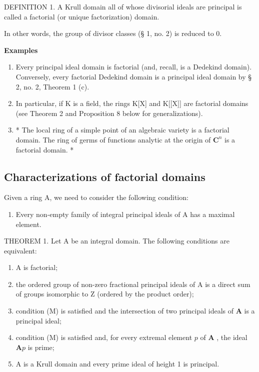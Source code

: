 DEFINITION 1. A Krull domain all of whose divisorial ideals are principal is called a factorial (or unique factorization) domain.

In other words, the group of divisor classes (§ 1, no. 2) is reduced to 0.

\textbf{Examples}\par

\begin{enumerate}
\def\labelenumi{(\arabic{enumi})}
\item
  Every principal ideal domain is factorial (and, recall, is a Dedekind domain). Conversely, every factorial Dedekind domain is a principal ideal domain by § 2, no. 2, Theorem 1 (c).
\item
  In particular, if K is a field, the rings K{[}X{]} and K{[}{[}X{]}{]} are factorial domains (see Theorem 2 and Proposition 8 below for generalizations).
\item
  * The local ring of a simple point of an algebraic variety is a factorial domain. The ring of germs of functions analytic at the origin of \(\mathbf{C}^n\) is a factorial domain. *
\end{enumerate}

\subsection{Characterizations of factorial domains}

Given a ring A, we need to consider the following condition:

\begin{enumerate}
\def\labelenumi{(\Alph{enumi})}
\setcounter{enumi}{12}
\tightlist
\item
  Every non-empty family of integral principal ideals of A has a maximal element.
\end{enumerate}

THEOREM 1. Let A be an integral domain. The following conditions are equivalent:

\begin{enumerate}
\def\labelenumi{(\alph{enumi})}
\item
  A is factorial;
\item
  the ordered group of non-zero fractional principal ideals of A is a direct sum of groups isomorphic to Z (ordered by the product order);
\item
  condition (M) is satisfied and the intersection of two principal ideals of \(\mathbf{A}\) is a principal ideal;
\item
  condition (M) is satisfied and, for every extremal element \(p\) of \(\mathbf{A}\) , the ideal \(\mathbf{A}p\) is prime;
\item
  A is a Krull domain and every prime ideal of height 1 is principal.
\end{enumerate}

